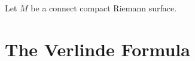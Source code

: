 Let $M$ be a connect compact Riemann surface. 
















































\newpage

\section{The Verlinde Formula}
